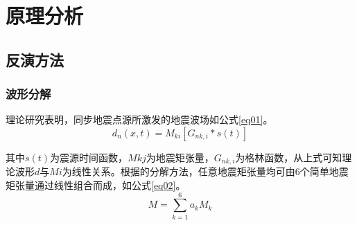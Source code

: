 

\chapter{原理分析}
\label{cha:intro}

\section{反演方法}
\subsection{波形分解}
理论研究表明，同步地震点源\citep{Silver1982}所激发的地震波场如公式\ref{eq01}\citep{Jost1989}。
\begin{equation}
\label{eq01}
d_n(x,t)=M_{ki}[G_{nk,i}*s(t)]
\end{equation}

其中$s(t)$为震源时间函数，$Mkj$为地震矩张量，$G_{nk,i}$为格林函数，从上式可知理论波形$d$与$Mi$为线性关系。根据\citet{Kikuchi1991}的分解方法，任意地震矩张量均可由6个简单地震矩张量通过线性组合而成，如公式\ref{eq02}。
\begin{equation}
\label{eq02}
M=\sum_{k=1}^6a_kM_k
\end{equation}

